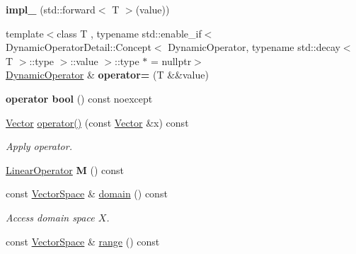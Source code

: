 \begin{DoxyCompactItemize}
\item 
\hypertarget{classSpacy_1_1DynamicOperator_a7d31898db1d94c20b9c93dfc88c5cecd}{{\bfseries impl\-\_\-} (std\-::forward$<$ \-T $>$(value))}\label{classSpacy_1_1DynamicOperator_a7d31898db1d94c20b9c93dfc88c5cecd}

\item 
\hypertarget{classSpacy_1_1DynamicOperator_af03a1b856d668cbd78eaf9df83487a55}{{\footnotesize template$<$class T , typename std\-::enable\-\_\-if$<$ Dynamic\-Operator\-Detail\-::\-Concept$<$ Dynamic\-Operator, typename std\-::decay$<$ T $>$\-::type $>$\-::value $>$\-::type $\ast$  = nullptr$>$ }\\\hyperlink{classSpacy_1_1DynamicOperator}{\-Dynamic\-Operator} \& {\bfseries operator=} (\-T \&\&value)}\label{classSpacy_1_1DynamicOperator_af03a1b856d668cbd78eaf9df83487a55}

\item 
\hypertarget{classSpacy_1_1DynamicOperator_a4d7243f9e135e01d4f87a0e21fe7cbe1}{{\bfseries operator bool} () const noexcept}\label{classSpacy_1_1DynamicOperator_a4d7243f9e135e01d4f87a0e21fe7cbe1}

\item 
\hypertarget{classSpacy_1_1DynamicOperator_ace2c2202ca6eb3fe5f5817087d30510a}{\hyperlink{classSpacy_1_1Vector}{\-Vector} \hyperlink{classSpacy_1_1DynamicOperator_ace2c2202ca6eb3fe5f5817087d30510a}{operator()} (const \hyperlink{classSpacy_1_1Vector}{\-Vector} \&x) const }\label{classSpacy_1_1DynamicOperator_ace2c2202ca6eb3fe5f5817087d30510a}

\begin{DoxyCompactList}\small\item\em \-Apply operator. \end{DoxyCompactList}\item 
\hypertarget{classSpacy_1_1DynamicOperator_a38c8c5337fd79a98a7e64139d0cbed38}{\hyperlink{classSpacy_1_1LinearOperator}{\-Linear\-Operator} {\bfseries \-M} () const }\label{classSpacy_1_1DynamicOperator_a38c8c5337fd79a98a7e64139d0cbed38}

\item 
\hypertarget{classSpacy_1_1DynamicOperator_ad457cb5571c721f97530895aa26af626}{const \hyperlink{classSpacy_1_1VectorSpace}{\-Vector\-Space} \& \hyperlink{classSpacy_1_1DynamicOperator_ad457cb5571c721f97530895aa26af626}{domain} () const }\label{classSpacy_1_1DynamicOperator_ad457cb5571c721f97530895aa26af626}

\begin{DoxyCompactList}\small\item\em \-Access domain space $X$. \end{DoxyCompactList}\item 
\hypertarget{classSpacy_1_1DynamicOperator_ab760994d921fa8d9df2882f9e4cfc9c3}{const \hyperlink{classSpacy_1_1VectorSpace}{\-Vector\-Space} \& \hyperlink{classSpacy_1_1DynamicOperator_ab760994d921fa8d9df2882f9e4cfc9c3}{range} () const }\label{classSpacy_1_1DynamicOperator_ab760994d921fa8d9df2882f9e4cfc9c3}


\end{DoxyCompactItemize}
